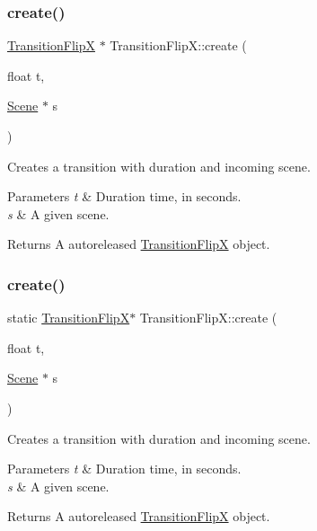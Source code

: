 \subsubsection{\texorpdfstring{create()}{create()}\hspace{0.1cm}{\footnotesize\ttfamily [3/4]}}
{\footnotesize\ttfamily \hyperlink{classTransitionFlipX}{Transition\+FlipX} $\ast$ Transition\+Flip\+X\+::create (\begin{DoxyParamCaption}\item[{float}]{t,  }\item[{\hyperlink{classScene}{Scene} $\ast$}]{s }\end{DoxyParamCaption})\hspace{0.3cm}{\ttfamily [static]}}

Creates a transition with duration and incoming scene.


\begin{DoxyParams}{Parameters}
{\em t} & Duration time, in seconds. \\
\hline
{\em s} & A given scene. \\
\hline
\end{DoxyParams}
\begin{DoxyReturn}{Returns}
A autoreleased \hyperlink{classTransitionFlipX}{Transition\+FlipX} object. 
\end{DoxyReturn}
\mbox{\label{classTransitionFlipX_aa8de9aba297a3126453bc2b7c42165ee}} 
\subsubsection{\texorpdfstring{create()}{create()}\hspace{0.1cm}{\footnotesize\ttfamily [4/4]}}
{\footnotesize\ttfamily static \hyperlink{classTransitionFlipX}{Transition\+FlipX}$\ast$ Transition\+Flip\+X\+::create (\begin{DoxyParamCaption}\item[{float}]{t,  }\item[{\hyperlink{classScene}{Scene} $\ast$}]{s }\end{DoxyParamCaption})\hspace{0.3cm}{\ttfamily [static]}}

Creates a transition with duration and incoming scene.


\begin{DoxyParams}{Parameters}
{\em t} & Duration time, in seconds. \\
\hline
{\em s} & A given scene. \\
\hline
\end{DoxyParams}
\begin{DoxyReturn}{Returns}
A autoreleased \hyperlink{classTransitionFlipX}{Transition\+FlipX} object. 
\end{DoxyReturn}
\mbox{\label{classTransitionFlipX_a736da7551a598a7f71167870f63a06d4}} 
